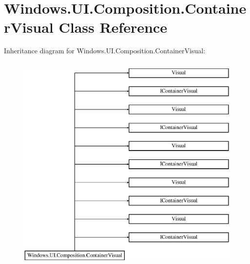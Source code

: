 \hypertarget{class_windows_1_1_u_i_1_1_composition_1_1_container_visual}{}\section{Windows.\+U\+I.\+Composition.\+Container\+Visual Class Reference}
\label{class_windows_1_1_u_i_1_1_composition_1_1_container_visual}
Inheritance diagram for Windows.\+U\+I.\+Composition.\+Container\+Visual\+:\begin{figure}[H]
\begin{center}
\leavevmode
\includegraphics[height=11.000000cm]{class_windows_1_1_u_i_1_1_composition_1_1_container_visual}
\end{center}
\end{figure}
